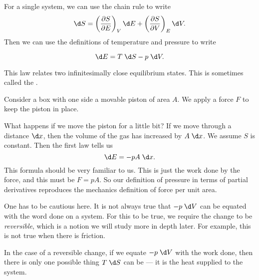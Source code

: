 \documentclass[a4paper]{article}
\begin{document}
For a single system, we can use the chain rule to write
\[
  \d S = \left(\frac{\partial S}{\partial E}\right)_V \d E + \left(\frac{\partial S}{\partial V}\right)_E \d V.
\]
Then we can use the definitions of temperature and pressure to write
\begin{prop}
  \[
    \d E = T\; \d S - p\; \d V.
  \]
\end{prop}
This law relates two infinitesimally close equilibrium states. This is sometimes called the .

\begin{eg}
  Consider a box with one side a movable piston of area $A$. We apply a force $F$ to keep the piston in place.
  \begin{center}
  \end{center}
  What happens if we move the piston for a little bit? If we move through a distance $\d x$, then the volume of the gas has increased by $A \;\d x$. We assume $S$ is constant. Then the first law tells us
  \[
    \d E = -pA \;\d x.
  \]
  This formula should be very familiar to us. This is just the work done by the force, and this must be $F = pA$. So our definition of pressure in terms of partial derivatives reproduces the mechanics definition of force per unit area.
\end{eg}

One has to be cautious here. It is not always true that $-p \;\d V$ can be equated with the word done on a system. For this to be true, we require the change to be \emph{reversible}, which is a notion we will study more in depth later. For example, this is not true when there is friction.

In the case of a reversible change, if we equate $-p \;\d V$ with the work done, then there is only one possible thing $T \;\d S$ can be --- it is the heat supplied to the system.
\end{document}
